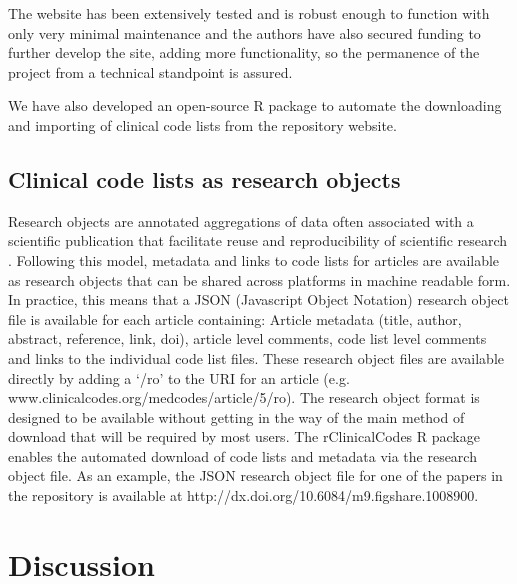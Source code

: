 \documentclass[10pt]{article}
\begin{document}
The website has been extensively tested and is robust enough to function with only very minimal maintenance and the authors have also secured funding to further develop the site, adding more functionality, so the permanence of the project from a technical standpoint is assured.

We have also developed an open-source R package \cite{Springate2014} to automate the downloading and importing of clinical code lists from the repository website.


\subsection*{Clinical code lists as research objects}


Research objects are annotated aggregations of data often associated with a scientific publication that facilitate reuse and reproducibility of scientific research \cite{Bechhofer2010}. Following this model, metadata and links to code lists for articles are available as research objects that can be shared across platforms in machine readable form.  In practice, this means that a JSON (Javascript Object Notation) research object file is available for each article containing: Article metadata (title, author, abstract, reference, link, doi), article level comments, code list level comments and links to the individual code list files. These research object files are available directly by adding a `/ro' to the URI for an article (e.g. www.clinicalcodes.org/medcodes/article/5/ro).  The research object format is designed to be available without getting in the way of the main method of download that will be required by most users.  The rClinicalCodes R package \cite{Springate2014} enables the automated download of code lists and metadata via the research object file. As an example, the JSON research object file for one of the papers in the repository \cite{Kontopantelis2014} is available at http://dx.doi.org/10.6084/m9.figshare.1008900.

\section*{Discussion}

\end{document}
